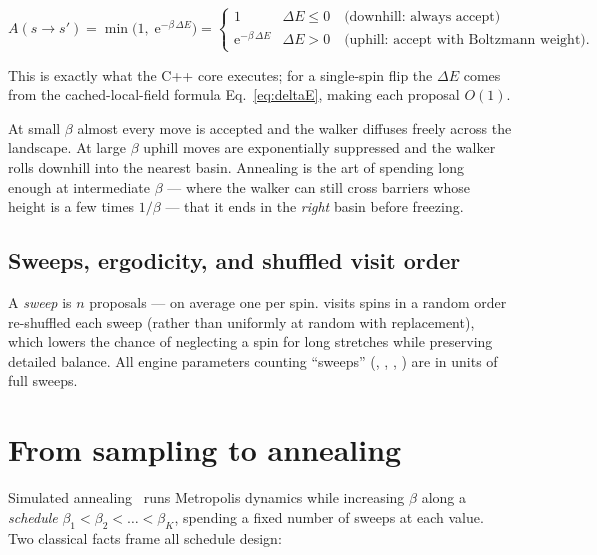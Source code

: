 \begin{keyeq}
\begin{equation}
A(s\to s')=\min\!\bigl(1,\;\mathrm{e}^{-\beta\,\Delta E}\bigr)
=\begin{cases}
1 & \Delta E\le 0 \quad\text{(downhill: always accept)}\\[2pt]
\mathrm{e}^{-\beta\,\Delta E} & \Delta E>0 \quad\text{(uphill: accept with Boltzmann weight)} .
\end{cases}
\label{eq:metropolis}
\end{equation}
\end{keyeq}

This is exactly what the C++ core executes; for a single-spin flip the
$\Delta E$ comes from the cached-local-field formula Eq.~\eqref{eq:deltaE},
making each proposal $O(1)$.

\begin{physbox}
At small $\beta$ almost every move is accepted and the walker diffuses freely
across the landscape. At large $\beta$ uphill moves are exponentially
suppressed and the walker rolls downhill into the nearest basin. Annealing
is the art of spending long enough at intermediate $\beta$ --- where the
walker can still cross barriers whose height is a few times $1/\beta$ ---
that it ends in the \emph{right} basin before freezing.
\end{physbox}

\subsection{Sweeps, ergodicity, and shuffled visit order}

A \emph{sweep} is $n$ proposals --- on average one per spin. \qv{} visits
spins in a random order re-shuffled each sweep (rather than uniformly at
random with replacement), which lowers the chance of neglecting a spin for
long stretches while preserving detailed balance. All engine parameters
counting ``sweeps'' (, ,
, ) are in units of full
sweeps.

\section{From sampling to annealing}
\label{sec:annealing-idea}

Simulated annealing~\cite{kirkpatrick} runs Metropolis dynamics while
increasing $\beta$ along a \emph{schedule}
$\beta_1<\beta_2<\dots<\beta_K$, spending a fixed number of sweeps at each
value. Two classical facts frame all schedule design:

